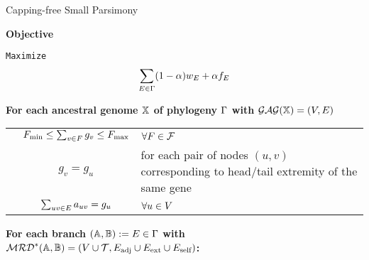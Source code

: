 
\begin{algorithm}[tbh]
\caption{Capping-free Small Parsimony}
\textbf{Objective}

\newcommand{\idx}{\texttt{ix}}
\hspace{0.5cm}\texttt{Maximize} 
\begin{equation*}
    \sum_{E \in\Gamma} (1-\alpha) w_E + \alpha f_E 
\end{equation*}


\textbf{For each ancestral genome $\mathbb{X}$ of phylogeny $\Gamma$ with $\mathcal{GAG}(\mathbb{X}) = (V, E)$}

\begin{constraints}
\begin{tabular}{lcl}
    \cns \label{c:cn} & $F_{\text{min}} \leq \sum_{v \in F} g_v \leq F_{\text{max}}$ & $\forall F \in \mathcal F$\\
    \cns \label{c:cn_consistent}& $g_v = g_u$ & for each pair of nodes $(u, v)$ corresponding to head/tail extremity of the same gene\todoDany{improve}\\
    \cns \label{c:genome}& $\sum_{uv \in E} a_{uv} = g_u$ & $\forall u \in V$\\
\end{tabular}
\end{constraints}

\medskip
{}

\textbf{For each branch $(\mathbb{A},\mathbb{B}):=E\in \Gamma$ with $\mathcal{MRD}^*(\mathbb{A},\mathbb{B}) = (V\cup\mathcal{T}, {E}_\text{adj} \cup {E}_{\text{ext}} \cup {E}_\text{self})$:}

\begin{constraints}
\begin{tabular}{lcl}


\end{tabular}
\end{constraints}
\end{algorithm}
